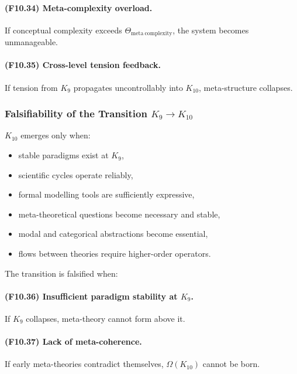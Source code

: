 \paragraph{(F10.34) Meta-complexity overload.}
If conceptual complexity exceeds $\Theta_{\mathrm{meta\ complexity}}$,
the system becomes unmanageable.

\paragraph{(F10.35) Cross-level tension feedback.}
If tension from $K_9$ propagates uncontrollably into $K_{10}$,
meta-structure collapses.



\subsubsection{Falsifiability of the Transition $K_9 \to K_{10}$}

$K_{10}$ emerges only when:

\begin{itemize}
    \item stable paradigms exist at $K_9$,
    \item scientific cycles operate reliably,
    \item formal modelling tools are sufficiently expressive,
    \item meta-theoretical questions become necessary and stable,
    \item modal and categorical abstractions become essential,
    \item flows between theories require higher-order operators.
\end{itemize}

The transition is falsified when:

\paragraph{(F10.36) Insufficient paradigm stability at \texorpdfstring{$K_9$}{K_9}.}
If $K_9$ collapses, meta-theory cannot form above it.

\paragraph{(F10.37) Lack of meta-coherence.}
If early meta-theories contradict themselves,
$\Omega(K_{10})$ cannot be born.

